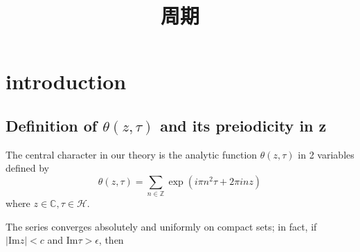 \documentclass[uplatex,b5j,11pt]{jsbook}
\title{周期}
\begin{document}
\chapter{introduction}
\section{Definition of $\theta(z, \tau)$ and its preiodicity in z}
The central character in our theory is the analytic function $\theta(z, \tau)$ in 2 variables defined by
\begin{equation*}
    \theta(z, \tau) = \sum_{n \in \mathbb{Z}} \exp(i\pi n^2 \tau + 2\pi in z)
\end{equation*}
where $z \in \mathbb{C}, \tau \in \mathcal{H}$.

The series converges absolutely and uniformly on compact sets; in fact,
if $|\mathrm{Im} z| < c$ and $ \mathrm{Im} \tau > \epsilon$, then
\end{document}
